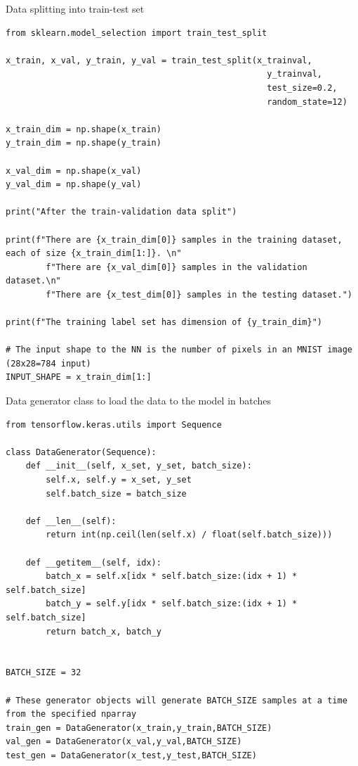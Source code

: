 \documentclass[a4paper]{article}
\begin{document}
Data splitting into train-test set

\begin{lstlisting}
from sklearn.model_selection import train_test_split

x_train, x_val, y_train, y_val = train_test_split(x_trainval,
                                                    y_trainval,
                                                    test_size=0.2,
                                                    random_state=12)

x_train_dim = np.shape(x_train)
y_train_dim = np.shape(y_train)

x_val_dim = np.shape(x_val)
y_val_dim = np.shape(y_val)

print("After the train-validation data split")

print(f"There are {x_train_dim[0]} samples in the training dataset, each of size {x_train_dim[1:]}. \n"
        f"There are {x_val_dim[0]} samples in the validation dataset.\n"
        f"There are {x_test_dim[0]} samples in the testing dataset.")

print(f"The training label set has dimension of {y_train_dim}")

# The input shape to the NN is the number of pixels in an MNIST image (28x28=784 input)
INPUT_SHAPE = x_train_dim[1:]
\end{lstlisting}

Data generator class to load the data to the model in batches
\begin{lstlisting}
from tensorflow.keras.utils import Sequence

class DataGenerator(Sequence):
    def __init__(self, x_set, y_set, batch_size):
        self.x, self.y = x_set, y_set
        self.batch_size = batch_size

    def __len__(self):
        return int(np.ceil(len(self.x) / float(self.batch_size)))

    def __getitem__(self, idx):
        batch_x = self.x[idx * self.batch_size:(idx + 1) * self.batch_size]
        batch_y = self.y[idx * self.batch_size:(idx + 1) * self.batch_size]
        return batch_x, batch_y


BATCH_SIZE = 32

# These generator objects will generate BATCH_SIZE samples at a time from the specified nparray
train_gen = DataGenerator(x_train,y_train,BATCH_SIZE)
val_gen = DataGenerator(x_val,y_val,BATCH_SIZE)
test_gen = DataGenerator(x_test,y_test,BATCH_SIZE)
\end{lstlisting}
\end{document}
